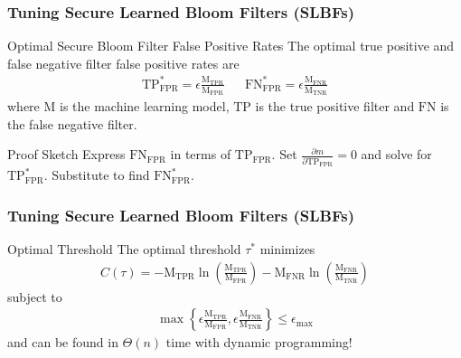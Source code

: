 \documentclass{beamer}
\begin{document}
\begin{frame}
\frametitle{Tuning Secure Learned Bloom Filters (SLBFs)}

\begin{block}{Optimal Secure Bloom Filter False Positive Rates}
    The optimal true positive and false negative filter false positive rates are
    \begin{align*}
        \text{TP}_\text{FPR}^* = \epsilon \frac{\text{M}_\text{TPR}}{\text{M}_\text{FPR}} && \text{FN}_\text{FPR}^* = \epsilon \frac{\text{M}_\text{FNR}}{\text{M}_\text{TNR}}
    \end{align*}
    where $\text{M}$ is the machine learning model, $\text{TP}$ is the true positive filter and $\text{FN}$ is the false negative filter.
\end{block}

\begin{block}{Proof Sketch}
    Express $\text{FN}_\text{FPR}$ in terms of $\text{TP}_\text{FPR}$. Set $\frac{\partial m}{\partial \text{TP}_\text{FPR}} = 0$ and solve for $\text{TP}_\text{FPR}^*$. Substitute to find $\text{FN}_\text{FPR}^*$.
\end{block}

\end{frame}


\begin{frame}
\frametitle{Tuning Secure Learned Bloom Filters (SLBFs)}

\begin{block}{Optimal Threshold}
    The optimal threshold $\tau^*$ minimizes
    \begin{align*}
        C(\tau) = -\text{M}_\text{TPR} \ln \left( \frac{\text{M}_\text{TPR}}{\text{M}_\text{FPR}} \right) 
 - \text{M}_\text{FNR} \ln \left( \frac{\text{M}_\text{FNR}}{\text{M}_\text{TNR}}\right)
    \end{align*}
    subject to
    \begin{align*}
        \max\left\{\epsilon\frac{\text{M}_\text{TPR}}{\text{M}_\text{FPR}}, \epsilon \frac{\text{M}_\text{FNR}}{\text{M}_\text{TNR}} \right\} \leq \epsilon_\text{max}
    \end{align*}
    and can be found in $\Theta(n)$ time with dynamic programming!
\end{block}

\end{frame}
\end{document}
